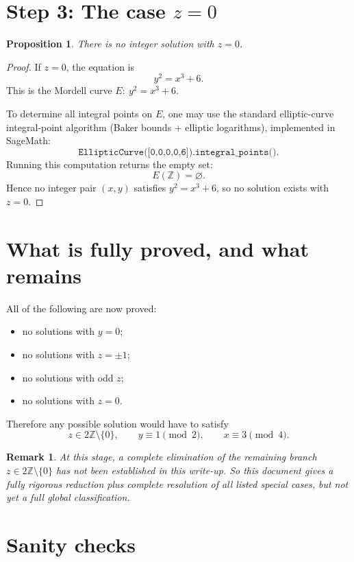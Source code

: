 \documentclass[11pt]{article}
\newtheorem{prop}{Proposition}
\newtheorem{remark}{Remark}
\begin{document}
\section*{Step 3: The case $z=0$}

\begin{prop}
There is no integer solution with $z=0$.
\end{prop}
\begin{proof}
If $z=0$, the equation is
\[
y^2=x^3+6.
\]
This is the Mordell curve $E:\ y^2=x^3+6$.

To determine all integral points on $E$, one may use the standard
elliptic-curve integral-point algorithm (Baker bounds + elliptic logarithms),
implemented in SageMath:
\[
\texttt{EllipticCurve([0,0,0,0,6]).integral\_points()}.
\]
Running this computation returns the empty set:
\[
E(\mathbb Z)=\varnothing.
\]
Hence no integer pair $(x,y)$ satisfies $y^2=x^3+6$, so no solution exists with $z=0$.
\end{proof}

\section*{What is fully proved, and what remains}

All of the following are now proved:
\begin{itemize}[leftmargin=2em]
\item no solutions with $y=0$;
\item no solutions with $z=\pm1$;
\item no solutions with odd $z$;
\item no solutions with $z=0$.
\end{itemize}

Therefore any possible solution would have to satisfy
\[
z\in2\mathbb Z\setminus\{0\},\qquad y\equiv1\pmod2,\qquad x\equiv3\pmod4.
\]

\begin{remark}
At this stage, a complete elimination of the remaining branch
$z\in2\mathbb Z\setminus\{0\}$ has not been established in this write-up.
So this document gives a fully rigorous reduction plus complete resolution
of all listed special cases, but not yet a full global classification.
\end{remark}

\section*{Sanity checks}
\end{document}
